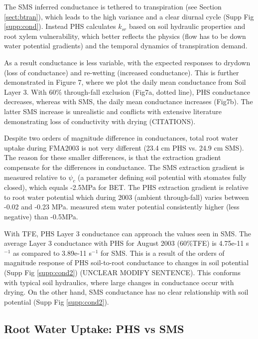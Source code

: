 \documentclass[draft,linenumbers]{agujournal}
\begin{document}
    The SMS inferred conductance is tethered to transpiration (see Section \ref{sect:btran}), 
    which leads to the high variance and a clear diurnal cycle (Supp Fig \ref{supp:cond}). 
    Instead PHS calculates $k_{sr}$ based on soil hydraulic properties and root xylem vulnerability, which better reflects the physics (flow has to be down water potential gradients) and the temporal dynamics of transpiration demand.
    
    As a result conductance is less variable, with the expected responses to drydown (loss of conductance) and re-wetting (increased conductance). This is further demonstrated in Figure 7, where we plot the daily mean conductance from Soil Layer 3. With 60\% through-fall exclusion (Fig7a, dotted line), PHS conductance decreases, whereas with SMS, the daily mean conductance increases (Fig7b). The latter SMS increase is unrealistic and conflicts with extensive literature demonstrating loss of conductivity with drying (CITATIONS).
    
    Despite two orders of magnitude difference in conductances, total root water uptake during FMA2003 is not very different (23.4 cm PHS vs. 24.9 cm SMS). The reason for these smaller differences, is that the extraction gradient compensate for the differences in conductance. The SMS extraction gradient is measured relative to $\psi_c$ (a parameter defining soil potential with stomates fully closed), which equals -2.5MPa for BET. The PHS extraction gradient is relative to root water potential which during 2003 (ambient through-fall) varies between -0.02 and -0.23 MPa. \citet{fisher2006} measured stem water potential consistently higher (less negative) than -0.5MPa.
    
    With TFE, PHS Layer 3 conductance can approach the values seen in SMS. The average Layer 3 conductance with PHS for August 2003 (60\%TFE) is 4.75e-11 s$^{-1}$ as compared to 3.89e-11 s$^{-1}$ for SMS. This is a result of the orders of magnitude response of PHS soil-to-root conductance to changes in soil potential (Supp Fig \ref{supp:cond2}) (UNCLEAR MODIFY SENTENCE).  This conforms with typical soil hydraulics, where large changes in conductance occur with drying. On the other hand, SMS conductance has no clear relationship with soil potential (Supp Fig \ref{supp:cond2}). 

\subsection{Root Water Uptake: PHS vs SMS}
\label{sect:rwu}
\end{document}
